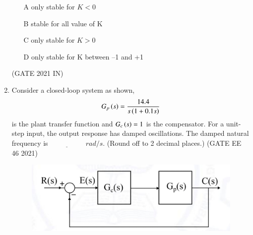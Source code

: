 \begin{enumerate}[label=\thechapter.\arabic*,ref=\thechapter.\theenumi]
\begin{enumerate}
\item[A]only stable for $K < 0$
\item[B]stable for all value of K
\item[C]only stable for $K > 0$
\item[D]only stable for K between –1 and +1
\end{enumerate}
\hfill(GATE 2021 IN)\\
\solution

\pagebreak
\item Consider a closed-loop system as shown, $$G_p\left(s\right)= \frac{14.4}{s\left(1+0.1s\right)}$$ is the plant transfer function and $G_c\left(s\right)=1$ is the compensator. For a unit-step input, the output response has damped oscillations. The damped natural frequency is $\underline{\hspace{2cm}}$
$rad/s$. (Round off to 2 decimal places.) 
\hfill(GATE EE 46 2021)

\begin{figure}[h]
    \centering  
\includegraphics[width=\columnwidth]{2021/EE/46/figs/dia.png}
    \label{fig:ee.46.2021}
\end{figure}
\solution 

\pagebreak
\end{enumerate}
